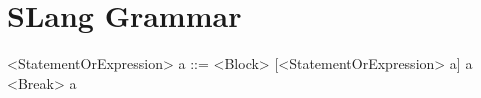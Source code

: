 \section{SLang Grammar}
\label{app:slang grammar}

\setlength{\grammarparsep}{20pt plus 1pt minus 1pt} %
\setlength{\grammarindent}{12em} %
\begin{grammar}
	<StatementOrExpression> a ::=	<Block> [<StatementOrExpression> a] a
	\alt  <Break> a
\end{grammar}
